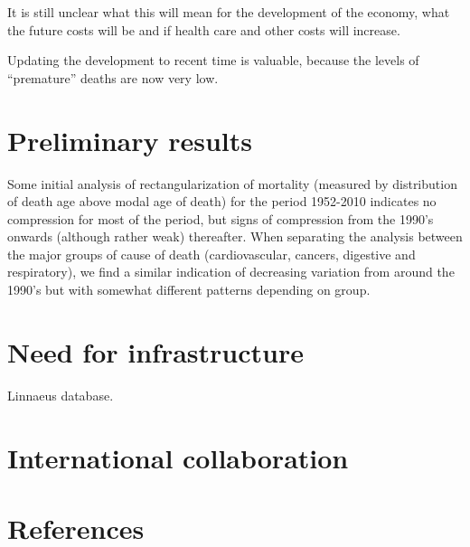 \documentclass[a4paper,12pt]{article}
\begin{document}
It is still unclear what this will mean for the development of the economy,
what the future costs will be and if health care and other costs will
increase. 

Updating the development to recent time is valuable, because the levels of
“premature” deaths are now very low. 

\section{Preliminary results}

Some initial analysis of rectangularization of mortality (measured by
distribution of death age above modal age of death) for the period
1952-2010 indicates no compression for most of the period, but signs of
compression from the 1990’s onwards (although rather weak) thereafter. When
separating the analysis between the major groups of cause of death
(cardiovascular, cancers, digestive and respiratory), we find a similar
indication of decreasing variation from around the 1990’s but with somewhat
different patterns depending on group. 

\section{Need for infrastructure}

Linnaeus database.

\section{International collaboration}

\section{References}
\end{document}
